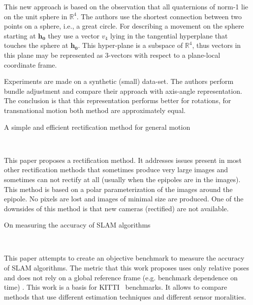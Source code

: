 \documentclass[10pt]{article}         %
\begin{document}
\begin{enumerate}
  This new approach is based on the observation that all quaternions
  of norm-1 lie on the unit sphere in $\mathbb{R}^4$.  The authors use
  the shortest connection between two points on a sphere, i.e., a great
  circle.  For describing a movement on the sphere starting at
  $\mathbf{h_0}$ they use a vector $v_4$ lying in the tangential
  hyperplane that touches the sphere at $\mathbf{h_0}$. This
  hyper-plane is a subspace of $\mathbb{R}^4$, thus vectors in this
  plane may be represented as 3-vectors with respect to a plane-local
  coordinate frame.

  Experiments are made on a synthetic (small) data-set.  The authors
  perform bundle adjustment and compare their approach with axis-angle
  representation.  The conclusion is that this representation performs
  better for rotations, for transnational motion both method are
  approximately equal.

  {\Large \item A simple and efficient rectification method for
    general motion}~\cite{pollefeys1999simple}

  This paper proposes a rectification method.  It addresses issues
  present in most other rectification methods that sometimes produce
  very large images and sometimes can not rectify at all (usually when
  the epipoles are in the images).  This method is based on a polar
  parameterization of the images around the epipole.  No pixels are
  lost and images of minimal size are produced.  One of the downsides
  of this method is that new cameras (rectified) are not available.


  {\Large \item On measuring the accuracy of SLAM
    algorithms}~\cite{kummerle2009measuring}

  This paper attempts to create an objective benchmark to measure the
  accuracy of SLAM algorithms.  The metric that this work proposes
  uses only relative poses and does not rely on a global reference
  frame (e.g. benchmark dependence on time) . This work is a basis for
  KITTI~\cite{geiger2012we} benchmarks.  It allows to compare methods
  that use different estimation techniques and different sensor
  moralities.

\end{enumerate}

{} 
\end{document}
